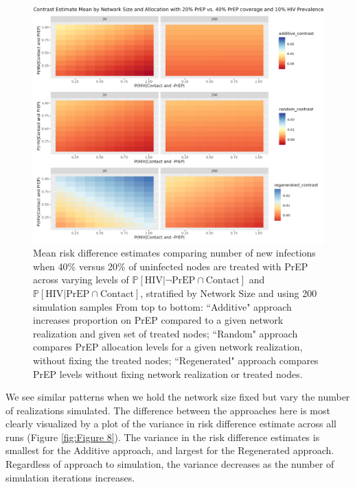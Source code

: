 \documentclass{article}
\theoremstyle{definition}
\begin{document}
\begin{figure}[H]
    \centering
    \includegraphics[width=\linewidth]{Corrected Figures/Network Size Mean Plot.png}
    \caption{Mean risk difference estimates comparing number of new infections when 40\% versus 20\% of uninfected nodes are treated with PrEP across varying levels of $\mathbb{P}\left[\text{HIV} \vert \neg \text{PrEP} \cap \text{Contact}\right]$ and $\mathbb{P}\left[\text{HIV} \vert \text{PrEP} \cap \text{Contact}\right]$, stratified by Network Size and using 200 simulation samples 
    From top to bottom: ``Additive" approach increases proportion on PrEP compared to a given network realization and given set of treated nodes; ``Random" approach compares PrEP allocation levels for a given network realization, without fixing the treated nodes; ``Regenerated" approach compares PrEP levels without fixing network realization or treated nodes. }
    \label{fig:Figure 7}
\end{figure}

We see similar patterns when we hold the network size fixed but vary the number of realizations simulated. The difference between the approaches here is most clearly visualized by a plot of the variance in risk difference estimate across all runs (Figure \ref{fig:Figure 8}). The variance in the risk difference estimates is smallest for the Additive approach, and largest for the Regenerated approach. Regardless of approach to simulation, the variance decreases as the number of simulation iterations increases.
\end{document}
